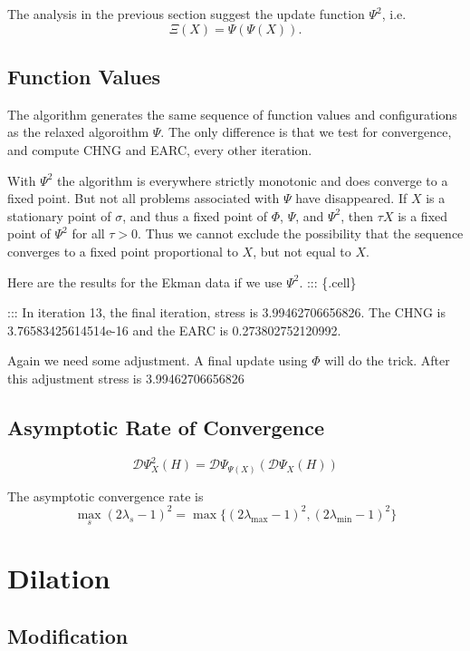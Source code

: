 \documentclass[
  12pt,
  letterpaper,
  DIV=11,
  numbers=noendperiod]{scrartcl}
\begin{document}
The analysis in the previous section suggest the update function
\(\Psi^2\), i.e. \[
\Xi(X)=\Psi(\Psi(X)).
\]

\subsection{Function Values}\label{function-values-5}

The algorithm generates the same sequence of function values and
configurations as the relaxed algoroithm \(\Psi\). The only difference
is that we test for convergence, and compute CHNG and EARC, every other
iteration.

With \(\Psi^2\) the algorithm is everywhere strictly monotonic and does
converge to a fixed point. But not all problems associated with \(\Psi\)
have disappeared. If \(X\) is a stationary point of \(\sigma\), and thus
a fixed point of \(\Phi\), \(\Psi\), and \(\Psi^2\), then \(\tau X\) is
a fixed point of \(\Psi^2\) for all \(\tau>0\). Thus we cannot exclude
the possibility that the sequence converges to a fixed point
proportional to \(X\), but not equal to \(X\).

Here are the results for the Ekman data if we use \(\Psi^2\). :::
\{.cell\}

::: In iteration 13, the final iteration, stress is 3.99462706656826.
The CHNG is 3.76583425614514e-16 and the EARC is 0.273802752120992.

Again we need some adjustment. A final update using \(\Phi\) will do the
trick. After this adjustment stress is 3.99462706656826

\subsection{Asymptotic Rate of
Convergence}\label{asymptotic-rate-of-convergence-5}

\[
\mathcal{D}\Psi^2_X(H)=\mathcal{D}\Psi_{\Psi(X)}(\mathcal{D}\Psi_X(H))
\]

The asymptotic convergence rate is \[
\max_s (2\lambda_s-1)^2=\max\{ (2\lambda_\text{max}-1)^2, (2\lambda_\text{min}-1)^2\}
\]

\section{Dilation}\label{dilation}

\subsection{Modification}\label{modification-5}
\end{document}
